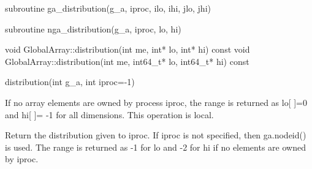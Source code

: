 \documentclass[12pt]{article}
\begin{document}
\begin{f2dapi}
\begin{fcode}
subroutine ga_distribution(g_a, iproc, ilo, ihi, jlo, jhi)
\end{fcode}
\begin{funcargs}
\end{funcargs}
\end{f2dapi}

\begin{fapi}
\begin{fcode}
subroutine nga_distribution(g_a, iproc, lo, hi)
\end{fcode}
\begin{funcargs}
\end{funcargs}
\end{fapi}

\begin{cxxapi}
\begin{cxxcode}
void GlobalArray::distribution(int me, int* lo, int* hi) const
void GlobalArray::distribution(int me, int64_t* lo, int64_t* hi) const
\end{cxxcode}
\begin{funcargs}
\end{funcargs}
\end{cxxapi}

\begin{pyapi}
\begin{pycode}
distribution(int g_a, int iproc=-1)
\end{pycode}
\end{pyapi}
\local
\begin{desc}

If no array elements are owned by process iproc, the range is returned as
lo[ ]=0 and hi[ ]= -1 for all dimensions.
This operation is local.


Return the distribution given to iproc. If iproc is not specified, then
ga.nodeid() is used. The range is returned as -1 for lo and -2 for hi if
no elements are owned by iproc.

\end{desc}
\end{document}
